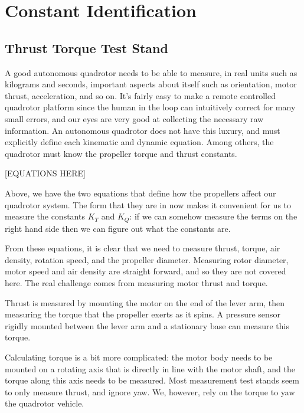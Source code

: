 \documentclass{article}
\numberwithin{equation}{section} %
\begin{document}


\section{Constant Identification}

\subsection{Thrust Torque Test Stand}

A good autonomous quadrotor needs to be able to measure, in real units such as kilograms and seconds, important aspects about itself such as orientation, motor thrust, acceleration, and so on. It's fairly easy to make a remote controlled quadrotor platform since the human in the loop can intuitively correct for many small errors, and our eyes are very good at collecting the necessary raw information. An autonomous quadrotor does not have this luxury, and must explicitly define each kinematic and dynamic equation. Among others, the quadrotor must know the propeller torque and thrust constants. 

[EQUATIONS HERE]

Above, we have the two equations that define how the propellers affect our quadrotor system. The form that they are in now makes it convenient for us to measure the constants $K_T$ and $K_Q$: if we can somehow measure the terms on the right hand side then we can figure out what the constants are.

From these equations, it is clear that we need to measure thrust, torque, air density, rotation speed, and the propeller diameter. Measuring rotor diameter, motor speed and air density are straight forward, and so they are not covered here. The real challenge comes from measuring motor thrust and torque.

Thrust is measured by mounting the motor on the end of the lever arm, then measuring the torque that the propeller exerts as it spins. A pressure sensor rigidly mounted between the lever arm and a stationary base can measure this torque.

Calculating torque is a bit more complicated: the motor body needs to be mounted on a rotating axis that is directly in line with the motor shaft, and the torque along this axis needs to be measured. Most measurement test stands seem to only measure thrust, and ignore yaw. We, however, rely on the torque to yaw the quadrotor vehicle.
\end{document}
